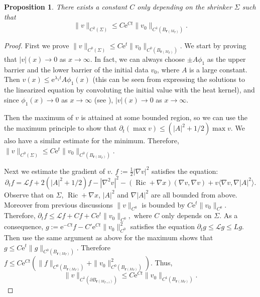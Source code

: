 \documentclass[12pt]{amsart}
\numberwithin{equation}{section}
\newtheorem{proposition}[theorem]{Proposition}
\numberwithin{equation}{section}
\newcommand{\cL}{\mathcal{L}}
\DeclareMathOperator{\Ric}{Ric}
\begin{document}
	\begin{proposition}\label{prop:v bound}
		There exists a constant $C$ only depending on the shrinker $\Sigma$ such that 
		\[\|v\|_{C^2(\Sigma)}\leq C\mathrm{e}^{Ct}\|v_0\|_{C^1(B_{\mathbf{r}(M_T)})}.\]
	\end{proposition}
	
	\begin{proof}
		First we prove 
		$\|v\|_{C^0(\Sigma)}\leq C\mathrm{e}^{t}\|v_0\|_{C^0(B_{\mathbf{r}(M_T)})}.$ We start by proving that $|v|(x)\to 0$ as $x\to\infty$. In fact, we can always choose $\pm A\phi_1$ as the upper barrier and the lower barrier of the initial data $v_0$, where $A$ is a large constant. Then $v(x)\leq \mathrm{e}^{\lambda_1 t}A\phi_1(x)$ (this can be seen from expressing the solutions to the linearized equation by convoluting the initial value with the heat kernel), and since $\phi_1(x)\to 0$ as $x\to\infty$ (see \cite{BW}), $|v|(x)\to 0$ as $x\to \infty$.
		
		Then the maximum of $v$ is attained at some bounded region, so we can use the the maximum principle to show that 
		$\partial_t(\max v)\leq (|A|^2+1/2)\max v.$
		We also have a similar estimate for the minimum. Therefore, $\|v\|_{C^0(\Sigma)}\leq C\mathrm{e}^t\|v_0\|_{C^0(B_{\mathbf{r}(M_T)})}$.
		
		Next we estimate the gradient of $v$. $f:=\frac{1}{2}|\nabla v|^2$ satisfies the equation:
		\begin{equation*}
			\partial_t f=\cL f+2(|A|^2+1/2)f-|\nabla ^2 v|^2 -(\Ric +\nabla x)(\nabla v,\nabla v)+v\langle \nabla v,\nabla |A|^2\rangle.
		\end{equation*}
		Observe that on $\Sigma$, $\Ric+\nabla x$, $|A|^2$ and $\nabla|A|^2$ are all bounded from above. Moreover from previous discussions $\|v\|_{C^0}$ is bounded by $C\mathrm{e}^t\|v_0\|_{C^0}$. Therefore,	$	\partial_t f\leq \cL f+C f+C\mathrm{e}^{t}\|v_0\|_{C^0},$	where $C$ only depends on $\Sigma$. As a consequence, $g:=\mathrm{e}^{-Ct}f-C'\mathrm{e}^{Ct}\|v_0\|^2_{C^0}$ satisfies the equation $	\partial_t g\leq \cL g\leq Lg.$ Then use the same argument as above for the maximum shows that
		$g\leq  C\mathrm{e}^t\|g\|_{C^0(B_{\mathbf{r}(M_T)})}.$
		Therefore $	f \leq C\mathrm{e}^{Ct}(\|f\|_{C^0(B_{\mathbf{r}(M_T)})}+\|v_0\|^2_{C^0(B_{\mathbf{r}(M_T)})}).$ 
		Thus,
		\begin{equation*}
			\|v\|_{C^1(\partial B_{\mathbf{r}(M_{T+t})})}\leq C\mathrm{e}^{Ct}\|v_0\|_{C^1(B_{\mathbf{r}(M_T)})}.
		\end{equation*}
		

\end{proof}
\end{document}
